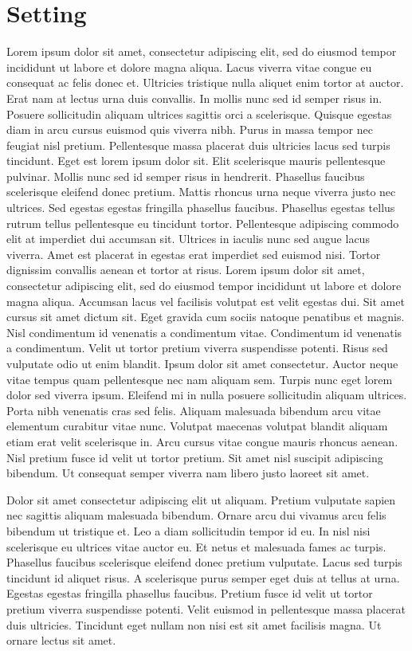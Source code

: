 \documentclass[a4]{report}
\begin{document}
\section{Setting}
Lorem ipsum dolor sit amet, consectetur adipiscing elit, sed do eiusmod tempor incididunt ut labore et dolore magna aliqua. Lacus viverra vitae congue eu consequat ac felis donec et. Ultricies tristique nulla aliquet enim tortor at auctor. Erat nam at lectus urna duis convallis. In mollis nunc sed id semper risus in. Posuere sollicitudin aliquam ultrices sagittis orci a scelerisque. Quisque egestas diam in arcu cursus euismod quis viverra nibh. Purus in massa tempor nec feugiat nisl pretium. Pellentesque massa placerat duis ultricies lacus sed turpis tincidunt. Eget est lorem ipsum dolor sit. Elit scelerisque mauris pellentesque pulvinar. Mollis nunc sed id semper risus in hendrerit. Phasellus faucibus scelerisque eleifend donec pretium. Mattis rhoncus urna neque viverra justo nec ultrices. Sed egestas egestas fringilla phasellus faucibus. Phasellus egestas tellus rutrum tellus pellentesque eu tincidunt tortor. Pellentesque adipiscing commodo elit at imperdiet dui accumsan sit. Ultrices in iaculis nunc sed augue lacus viverra. Amet est placerat in egestas erat imperdiet sed euismod nisi. Tortor dignissim convallis aenean et tortor at risus.
Lorem ipsum dolor sit amet, consectetur adipiscing elit, sed do eiusmod tempor incididunt ut labore et dolore magna aliqua. Accumsan lacus vel facilisis volutpat est velit egestas dui. Sit amet cursus sit amet dictum sit. Eget gravida cum sociis natoque penatibus et magnis. Nisl condimentum id venenatis a condimentum vitae. Condimentum id venenatis a condimentum. Velit ut tortor pretium viverra suspendisse potenti. Risus sed vulputate odio ut enim blandit. Ipsum dolor sit amet consectetur. Auctor neque vitae tempus quam pellentesque nec nam aliquam sem. Turpis nunc eget lorem dolor sed viverra ipsum. Eleifend mi in nulla posuere sollicitudin aliquam ultrices. Porta nibh venenatis cras sed felis. Aliquam malesuada bibendum arcu vitae elementum curabitur vitae nunc. Volutpat maecenas volutpat blandit aliquam etiam erat velit scelerisque in. Arcu cursus vitae congue mauris rhoncus aenean. Nisl pretium fusce id velit ut tortor pretium. Sit amet nisl suscipit adipiscing bibendum. Ut consequat semper viverra nam libero justo laoreet sit amet.

Dolor sit amet consectetur adipiscing elit ut aliquam. Pretium vulputate sapien nec sagittis aliquam malesuada bibendum. Ornare arcu dui vivamus arcu felis bibendum ut tristique et. Leo a diam sollicitudin tempor id eu. In nisl nisi scelerisque eu ultrices vitae auctor eu. Et netus et malesuada fames ac turpis. Phasellus faucibus scelerisque eleifend donec pretium vulputate. Lacus sed turpis tincidunt id aliquet risus. A scelerisque purus semper eget duis at tellus at urna. Egestas egestas fringilla phasellus faucibus. Pretium fusce id velit ut tortor pretium viverra suspendisse potenti. Velit euismod in pellentesque massa placerat duis ultricies. Tincidunt eget nullam non nisi est sit amet facilisis magna. Ut ornare lectus sit amet.
\end{document}
